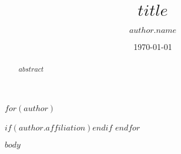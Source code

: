 \documentclass[aps,prd,preprint,onecolumn,nofootinbib,longbibliography]{revtex4-2}
\begin{document}
\title{$title$}
$for(author)$
\author{$author.name$}
$if(author.affiliation)$$endif$
$endfor$

\date{\today}

\begin{abstract}
$abstract$
\end{abstract}

\maketitle

$body$



\end{document}
